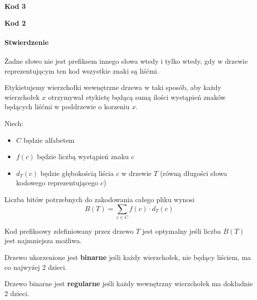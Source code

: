 \textbf{Kod 3}

\textbf{Kod 2}

\paragraph{Stwierdzenie} Żadne słowo nie jest prefiksem innego słowa wtedy i tylko wtedy, gdy w drzewie reprezentującym ten kod wszystkie znaki są liśćmi.
\begin{center}
\end{center}

Etykietujemy wierzchołki wewnętrzne drzewa w taki sposób, aby każdy wierzchołek $x$ otrzymywał etykietę będącą sumą ilości wystąpień znaków będących liśćmi w poddrzewie o korzeniu $x$. 

Niech:
\begin{itemize}
\item $C$ będzie alfabetem
\item $f(c)$ będzie liczbą wystąpień znaku $c$
\item $d_T(c)$ będzie głębokością liścia $c$ w drzewie $T$ (równą długości słowa kodowego reprezentującego $c$)
\end{itemize}  Liczba bitów potrzebnych do zakodowania całego pliku wynosi 
$$B(T) = \sum_{c \in C} f(c) \cdot d_T(c)$$

Kod prefiksowy zdefiniowany przez drzewo $T$ jest optymalny jeśli liczba $B(T)$ jest najmniejsza możliwa.

Drzewo ukorzenione jest \textbf{binarne} jeśli każdy wierzchołek, nie będący liściem, ma co najwyżej 2 dzieci.

Drzewo binarne jest \textbf{regularne} jeśli każdy wewnętrzny wierzchołek ma dokładnie 2 dzieci.

